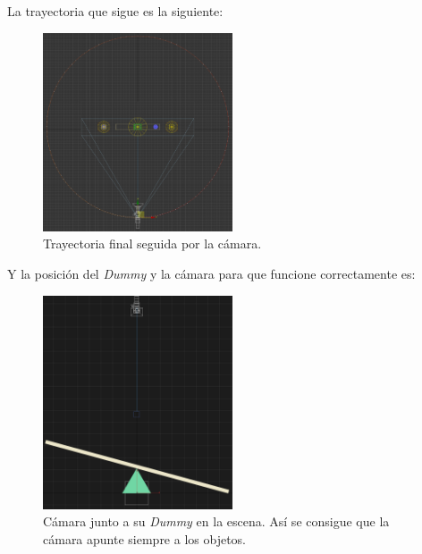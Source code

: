 \newpage

La trayectoria que sigue es la siguiente:

\begin{figure}[H]
   \centering
   \includegraphics[width=0.5\textwidth]{imagenes/misc/CameraPath.png}
   \caption{Trayectoria final seguida por la cámara.}
\end{figure}

\bigskip

Y la posición del \textit{Dummy} y la cámara para que funcione correctamente es:

\begin{figure}[H]
   \centering
   \includegraphics[width=0.5\textwidth]{imagenes/misc/DummyCamera.png}
   \caption{Cámara junto a su \textit{Dummy} en la escena. Así se consigue que la cámara apunte siempre a los objetos.}
\end{figure}

\newpage